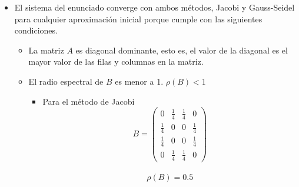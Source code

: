 \begin{itemize}
    \item El sistema del enunciado converge con ambos métodos, Jacobi y Gauss-Seidel para cualquier aproximación inicial porque cumple con las siguientes condiciones.
    
    \begin{itemize}
        \item La matriz $A$ es diagonal dominante, esto es, el valor de la diagonal es el mayor valor de las filas y columnas en la matriz.
        
        \item El radio espectral de $B$ es menor a 1. $\rho(B) < 1$
        
        \begin{itemize}
            \item Para el método de Jacobi\\
            \begin{equation*}
                B = 
                \begin{pmatrix}
                    0 & \frac{1}{4} & \frac{1}{4} & 0 \\
                    \frac{1}{4} & 0 & 0 & \frac{1}{4} \\
                    \frac{1}{4} & 0 & 0 & \frac{1}{4} \\
                    0 & \frac{1}{4} & \frac{1}{4} & 0
                \end{pmatrix}
            \end{equation*}
            \\
            \begin{equation*}
                \rho(B) = 0.5
            \end{equation*}
            
        \end{itemize}
    \end{itemize}
    

\end{itemize}
